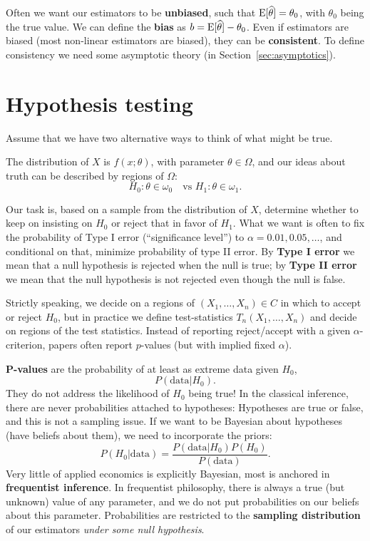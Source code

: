 \documentclass[twoside]{article}
\begin{document}
Often we want our estimators to be \textbf{unbiased}, such that
$\operatorname{E}[\widehat{\theta}]=\theta_0$, with $\theta_0$ being the true value. We can
define the \textbf{bias} as $b=\operatorname{E}[\widehat{\theta}] -\theta_0$. Even if
estimators are biased (most non-linear estimators are biased), they can be
\textbf{consistent}. To define consistency we need some asymptotic theory (in
Section~\ref{sec:asymptotics}).

\section{Hypothesis testing}
Assume that we have two alternative ways to think of what might
be true.

The distribution of $X$ is $f(x;\theta)$, with parameter
$\theta\in\Omega$, and our ideas about truth can be described by
regions of $\Omega$:
\[ H_0: \theta\in\omega_0 \quad \text{vs $H_1: \theta\in\omega_1$.}
\]

Our task is, based on a sample from the distribution of $X$, determine
whether to keep on insisting on $H_0$ or reject that in favor of
$H_1$. What we want is often to fix the probability of Type I error
(``significance level'') to $\alpha=0.01,0.05,\dots$, and conditional
on that, minimize probability of type II error. By \textbf{Type I error} we mean that
a null hypothesis is rejected when the null is true; by \textbf{Type II error} we mean
that the null hypothesis is not rejected even though the null is false.

Strictly speaking, we decide on a regions of $(X_1,\dots,X_n)\in C$ in
which to accept or reject $H_0$, but in practice we define
test-statistics $T_n(X_1,\dots,X_n)$ and decide on regions of the test
statistics.
Instead of reporting reject/accept with a given $\alpha$-criterion, papers often report $p$-values (but with
implied fixed $\alpha$). 

\textbf{P-values} are the probability of at least as extreme data given $H_0$,
\[ P( \text{data}| H_0).\]
They do not address the likelihood of $H_0$ being true!
In the classical inference, there are never probabilities attached to hypotheses: Hypotheses are true 
or false, and this is not a sampling issue.
If we want to be Bayesian about hypotheses (have beliefs about them), we need to incorporate the priors: 
\[ P(H_0|\text{data}) = \frac{ P(\text{data}|H_0) P(H_0)}{ P(\text{data}) }. \]
Very little of applied economics is explicitly Bayesian, most is anchored in
\textbf{frequentist inference}. In frequentist philosophy, there is always a
true (but unknown) value of any parameter, and we do not put probabilities on
our beliefs about this parameter. Probabilities are restricted to the
\textbf{sampling distribution} of our estimators \emph{under some null
hypothesis}.
\end{document}
